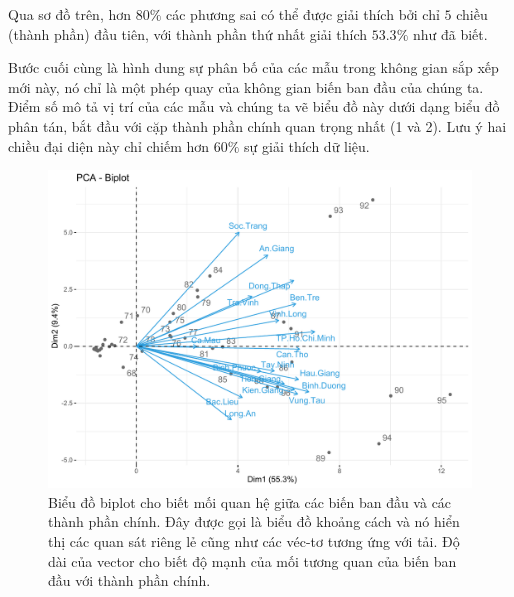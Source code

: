 \documentclass[../thesis.tex]{subfiles}
\begin{document}
Qua sơ đồ trên, hơn $ 80\% $ các phương sai có thể được giải thích bởi chỉ $ 5 $ chiều (thành phần) đầu tiên, với thành phần thứ nhất giải thích $ 53.3\% $ như đã biết.







\newpage


Bước cuối cùng là hình dung sự phân bố của các mẫu trong không gian sắp xếp mới này, nó chỉ là một phép quay của không gian biến ban đầu của chúng ta. Điểm số mô tả vị trí của các mẫu và chúng ta vẽ biểu đồ này dưới dạng biểu đồ phân tán, bắt đầu với cặp thành phần chính quan trọng nhất (1 và 2). Lưu ý hai chiều đại diện này chỉ chiếm hơn $ 60\% $ sự giải thích dữ liệu.
\begin{Shaded}
	\begin{Highlighting}[]
\SpecialCharTok{\%\textgreater{}\%}\SpecialCharTok{::}
		 \NormalTok{,}
		 \NormalTok{,}
		 \NormalTok{)}
	\end{Highlighting}
\end{Shaded}

\begin{figure}[H]
	\centering
	\includegraphics[width=0.7\linewidth]{images/biplot_case}
	\caption[Biểu đồ biplot cho dữ liệu hằng ngày]{Biểu đồ biplot cho biết mối quan hệ giữa các biến ban đầu và các thành phần chính. Đây được gọi là biểu đồ khoảng cách và nó hiển thị các quan sát riêng lẻ cũng như các véc-tơ tương ứng với tải. Độ dài của vector cho biết độ mạnh của mối tương quan của biến ban đầu với thành phần chính.}
	\label{fig:biplotcase}
\end{figure}
\end{document}
